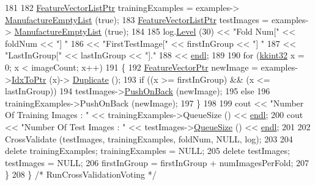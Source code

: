 \begin{DoxyCode}
181 
182     \hyperlink{class_k_k_m_l_l_1_1_feature_vector_list}{FeatureVectorListPtr}  trainingExamples = examples->
      \hyperlink{class_k_k_m_l_l_1_1_feature_vector_list_af533da1b34e4123f4fcb1343d5f48e37}{ManufactureEmptyList} (\textcolor{keyword}{true});
183     \hyperlink{class_k_k_m_l_l_1_1_feature_vector_list}{FeatureVectorListPtr}  testImages       = examples->
      \hyperlink{class_k_k_m_l_l_1_1_feature_vector_list_af533da1b34e4123f4fcb1343d5f48e37}{ManufactureEmptyList} (\textcolor{keyword}{true});
184 
185     log.\hyperlink{class_k_k_b_1_1_run_log_a32cf761d7f2e747465fd80533fdbb659}{Level} (30) << \textcolor{stringliteral}{"Fold Num["}        << foldNum        << \textcolor{stringliteral}{"]   "}
186                    << \textcolor{stringliteral}{"FirstTestImage["}  << firstInGroup   << \textcolor{stringliteral}{"]   "}
187                    << \textcolor{stringliteral}{"LastInGroup["}     << lastInGroup    << \textcolor{stringliteral}{"]."}
188                    << \hyperlink{namespace_k_k_b_ad1f50f65af6adc8fa9e6f62d007818a8}{endl};
189 
190     \textcolor{keywordflow}{for}  (\hyperlink{namespace_k_k_b_a8fa4952cc84fda1de4bec1fbdd8d5b1b}{kkint32}  x = 0; x < imageCount; x++)
191     \{
192       \hyperlink{class_k_k_m_l_l_1_1_feature_vector}{FeatureVectorPtr}  newImage = examples->\hyperlink{class_k_k_b_1_1_k_k_queue_acce2bdd8b3327e38266cf198382cd852}{IdxToPtr} (x)->
      \hyperlink{class_k_k_m_l_l_1_1_feature_vector_a7be1e7f38a9d57f3be9bea904cf60be9}{Duplicate} ();
193       \textcolor{keywordflow}{if}  ((x >= firstInGroup)  &&  (x <= lastInGroup))
194         testImages->\hyperlink{class_k_k_m_l_l_1_1_feature_vector_list_abd43779a90a6aa3db1de8092be877bdb}{PushOnBack} (newImage);
195       \textcolor{keywordflow}{else}
196         trainingExamples->PushOnBack (newImage);
197     \}
198 
199     cout << \textcolor{stringliteral}{"Number Of Training Images : "} << trainingExamples->QueueSize () << 
      \hyperlink{namespace_k_k_b_ad1f50f65af6adc8fa9e6f62d007818a8}{endl};
200     cout << \textcolor{stringliteral}{"Number Of Test Images     : "} << testImages->\hyperlink{class_k_k_b_1_1_k_k_queue_a1dab601f75ee6a65d97f02bddf71c40d}{QueueSize} ()     << 
      \hyperlink{namespace_k_k_b_ad1f50f65af6adc8fa9e6f62d007818a8}{endl};
201 
202     CrossValidate (testImages, trainingExamples, foldNum, NULL, log);
203 
204     \textcolor{keyword}{delete}  trainingExamples;  trainingExamples = NULL;
205     \textcolor{keyword}{delete}  testImages;        testImages       = NULL;
206     firstInGroup = firstInGroup + numImagesPerFold;
207   \}
208 \}  \textcolor{comment}{/* RunCrossValidationVoting */}
\end{DoxyCode}
